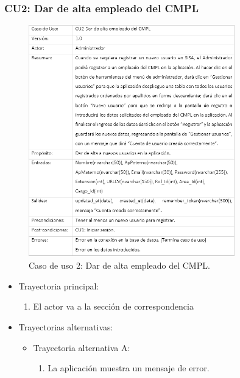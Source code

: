 		\subsubsection{CU2: Dar de alta empleado del CMPL}
			\begin{figure}[htbp!]
				\centering
					\includegraphics[width=0.8\textwidth]{images/CU/CU2}
					\caption{Caso de uso 2: Dar de alta empleado del CMPL.}
				\label{Tabla}
			\end{figure}
			
			\begin{itemize}
				\item Trayectoria principal:
					\begin{enumerate}
						\item El actor va a la sección de correspondencia 
					\end{enumerate}
				\item Trayectorias alternativas:
					\begin{itemize}
						\item Trayectoria alternativa A:
							\begin{enumerate}
								\item La aplicación muestra un mensaje de error.
							\end{enumerate}
					\end{itemize}
			\end{itemize}
			
